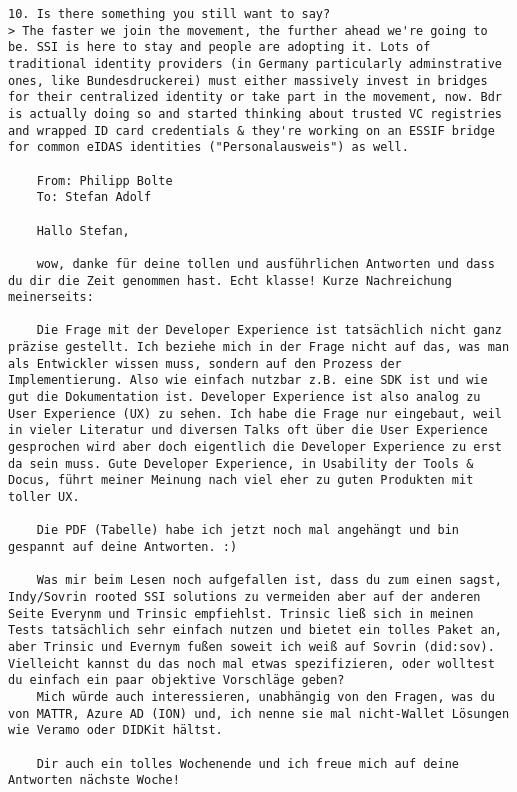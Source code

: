\begin{Verbatim}[breaklines=true, breaksymbol={}, breaksymbolsepleftnchars=2]
10. Is there something you still want to say?
> The faster we join the movement, the further ahead we're going to be. SSI is here to stay and people are adopting it. Lots of traditional identity providers (in Germany particularly adminstrative ones, like Bundesdruckerei) must either massively invest in bridges for their centralized identity or take part in the movement, now. Bdr is actually doing so and started thinking about trusted VC registries and wrapped ID card credentials & they're working on an ESSIF bridge for common eIDAS identities ("Personalausweis") as well.

    From: Philipp Bolte
    To: Stefan Adolf
    
    Hallo Stefan,

    wow, danke für deine tollen und ausführlichen Antworten und dass du dir die Zeit genommen hast. Echt klasse! Kurze Nachreichung meinerseits:
    
    Die Frage mit der Developer Experience ist tatsächlich nicht ganz präzise gestellt. Ich beziehe mich in der Frage nicht auf das, was man als Entwickler wissen muss, sondern auf den Prozess der Implementierung. Also wie einfach nutzbar z.B. eine SDK ist und wie gut die Dokumentation ist. Developer Experience ist also analog zu User Experience (UX) zu sehen. Ich habe die Frage nur eingebaut, weil in vieler Literatur und diversen Talks oft über die User Experience gesprochen wird aber doch eigentlich die Developer Experience zu erst da sein muss. Gute Developer Experience, in Usability der Tools & Docus, führt meiner Meinung nach viel eher zu guten Produkten mit toller UX. 
    
    Die PDF (Tabelle) habe ich jetzt noch mal angehängt und bin gespannt auf deine Antworten. :)
    
    Was mir beim Lesen noch aufgefallen ist, dass du zum einen sagst, Indy/Sovrin rooted SSI solutions zu vermeiden aber auf der anderen Seite Everynm und Trinsic empfiehlst. Trinsic ließ sich in meinen Tests tatsächlich sehr einfach nutzen und bietet ein tolles Paket an, aber Trinsic und Evernym fußen soweit ich weiß auf Sovrin (did:sov). Vielleicht kannst du das noch mal etwas spezifizieren, oder wolltest du einfach ein paar objektive Vorschläge geben?
    Mich würde auch interessieren, unabhängig von den Fragen, was du von MATTR, Azure AD (ION) und, ich nenne sie mal nicht-Wallet Lösungen wie Veramo oder DIDKit hältst. 
    
    Dir auch ein tolles Wochenende und ich freue mich auf deine Antworten nächste Woche!
    

\end{Verbatim}
